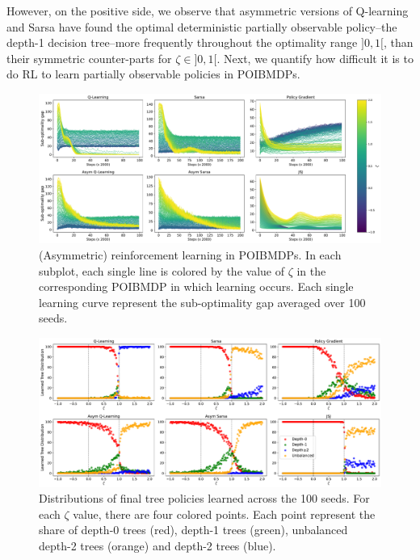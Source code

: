 However, on the positive side, we observe that asymmetric versions of Q-learning and Sarsa have found the optimal deterministic partially observable policy--the depth-1 decision tree--more frequently throughout the optimality range $]0,1[$, than their symmetric counter-parts for $\zeta\in ]0, 1[$.
Next, we quantify how difficult it is to do RL to learn partially observable policies in POIBMDPs.

\begin{figure}
    \centering
    \includegraphics[width=1\textwidth]{images/images_part1/learning_curves.pdf}
    \caption{(Asymmetric) reinforcement learning in POIBMDPs. 
    In each subplot, each single line is colored by the value of $\zeta$ in the corresponding POIBMDP in which learning occurs. 
    Each single learning curve represent the sub-optimality gap averaged over 100 seeds.
    }\label{fig:rl-poibmdp}
\end{figure}

\begin{figure}
    \centering
    \includegraphics[width=1\textwidth]{images/images_part1/tree_distributions.pdf}
    \caption{Distributions of final tree policies learned across the 100 seeds.
    For each $\zeta$ value, there are four colored points. Each point represent the share of depth-0 trees (red), depth-1 trees (green), unbalanced depth-2 trees (orange) and depth-2 trees (blue).
    }\label{fig:dt-distrib-poibmdp}
\end{figure}


